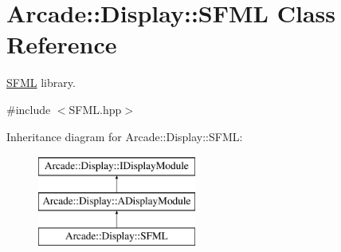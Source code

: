 \hypertarget{classArcade_1_1Display_1_1SFML}{}\section{Arcade\+::Display\+::S\+F\+ML Class Reference}
\label{classArcade_1_1Display_1_1SFML}


\mbox{\hyperlink{classArcade_1_1Display_1_1SFML}{S\+F\+ML}} library.  




{\ttfamily \#include $<$S\+F\+M\+L.\+hpp$>$}

Inheritance diagram for Arcade\+::Display\+::S\+F\+ML\+:\begin{figure}[H]
\begin{center}
\leavevmode
\includegraphics[height=3.000000cm]{classArcade_1_1Display_1_1SFML}
\end{center}
\end{figure}
